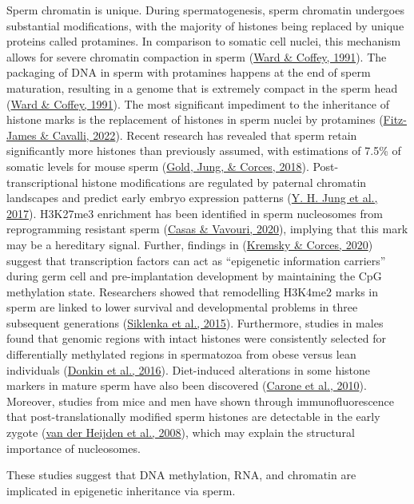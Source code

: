\documentclass[12pt,twoside]{reedthesis}
\begin{document}
Sperm chromatin is unique. During spermatogenesis, sperm chromatin
undergoes substantial modifications, with the majority of histones being
replaced by unique proteins called protamines. In comparison to somatic
cell nuclei, this mechanism allows for severe chromatin compaction in
sperm (\protect\hyperlink{ref-ward1991}{Ward \& Coffey, 1991}). The packaging of DNA in sperm with protamines happens
at the end of sperm maturation, resulting in a genome that is extremely
compact in the sperm head (\protect\hyperlink{ref-ward1991}{Ward \& Coffey, 1991}). The most significant impediment
to the inheritance of histone marks is the replacement of histones in
sperm nuclei by protamines (\protect\hyperlink{ref-fitz-james2022}{Fitz-James \& Cavalli, 2022}). Recent research has
revealed that sperm retain significantly more histones than previously
assumed, with estimations of 7.5\% of somatic levels for mouse sperm
(\protect\hyperlink{ref-gold2018}{Gold, Jung, \& Corces, 2018}). Post-transcriptional histone modifications are regulated by
paternal chromatin landscapes and predict early embryo expression
patterns (\protect\hyperlink{ref-jung2017}{Y. H. Jung et al., 2017}). H3K27me3 enrichment has been identified in sperm
nucleosomes from reprogramming resistant sperm (\protect\hyperlink{ref-casas2020}{Casas \& Vavouri, 2020}), implying
that this mark may be a hereditary signal. Further, findings in
(\protect\hyperlink{ref-kremsky2020}{Kremsky \& Corces, 2020}) suggest that transcription factors can act as ``epigenetic
information carriers'' during germ cell and pre-implantation development
by maintaining the CpG methylation state. Researchers showed that
remodelling H3K4me2 marks in sperm are linked to lower survival and
developmental problems in three subsequent generations (\protect\hyperlink{ref-siklenka2015}{Siklenka et al., 2015}).
Furthermore, studies in males found that genomic regions with intact
histones were consistently selected for differentially methylated
regions in spermatozoa from obese versus lean individuals (\protect\hyperlink{ref-donkin2016}{Donkin et al., 2016}).
Diet-induced alterations in some histone markers in mature sperm have
also been discovered (\protect\hyperlink{ref-carone2010}{Carone et al., 2010}). Moreover, studies from mice and men
have shown through immunofluorescence that post-translationally modified
sperm histones are detectable in the early zygote (\protect\hyperlink{ref-vanderheijden2008}{van der Heijden et al., 2008}),
which may explain the structural importance of nucleosomes.

\hfill\break
These studies suggest that DNA methylation, RNA, and chromatin are
implicated in epigenetic inheritance via sperm.
\end{document}
